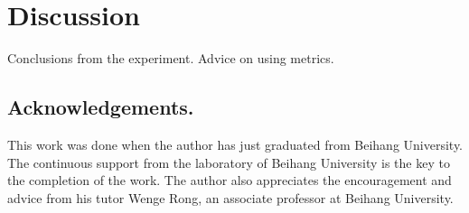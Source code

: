 \documentclass[runningheads]{llncs}
\begin{document}
    \section{Discussion}
    Conclusions from the experiment.
    Advice on using metrics.

    \subsection*{Acknowledgements.}
    This work was done when the author has just graduated from Beihang University. The continuous support from the laboratory of Beihang University is the key to the completion of the work. The author also appreciates the encouragement and advice from his tutor Wenge Rong, an associate professor at Beihang University.

    
    
\end{document}
